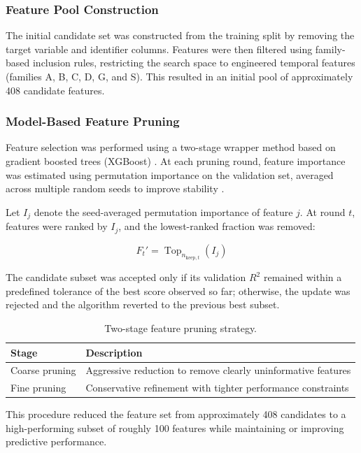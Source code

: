 \subsubsection*{Feature Pool Construction}

The initial candidate set was constructed from the training split by removing the target variable and identifier columns. Features were then filtered using family-based inclusion rules, restricting the search space to engineered temporal features (families A, B, C, D, G, and S). This resulted in an initial pool of approximately 408 candidate features.

\subsubsection*{Model-Based Feature Pruning}

Feature selection was performed using a two-stage wrapper method based on gradient boosted trees (XGBoost) \cite{chen2016xgboost}. At each pruning round, feature importance was estimated using permutation importance on the validation set, averaged across multiple random seeds to improve stability \cite{fisher2019}.

Let $I_j$ denote the seed-averaged permutation importance of feature $j$. At round $t$, features were ranked by $I_j$, and the lowest-ranked fraction was removed:

\begin{equation}
F_t' = \operatorname{Top}_{n_{\text{keep},t}}(I_j)
\end{equation}

The candidate subset was accepted only if its validation $R^2$ remained within a predefined tolerance of the best score observed so far; otherwise, the update was rejected and the algorithm reverted to the previous best subset.

\begin{table}[H]
\centering
\begin{tabular}{ll}
\toprule
\textbf{Stage} & \textbf{Description} \\
\midrule
Coarse pruning & Aggressive reduction to remove clearly uninformative features \\
Fine pruning & Conservative refinement with tighter performance constraints \\
\bottomrule
\end{tabular}
\caption{Two-stage feature pruning strategy.}
\end{table}

This procedure reduced the feature set from approximately 408 candidates to a high-performing subset of roughly 100 features while maintaining or improving predictive performance.

